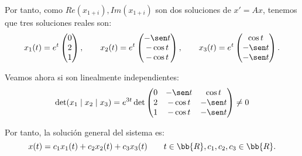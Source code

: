 \begin{ejercicio}
\begin{enumerate}
        Por tanto, como $Re(x_{1+i}), Im(x_{1+i})$ son dos soluciones de $x' = Ax$, tenemos que tres soluciones reales son:
        \begin{equation*}
            x_1(t) = e^t\begin{pmatrix}
                0\\
                2\\
                1
            \end{pmatrix},\qquad
            x_2(t) = e^t\begin{pmatrix}
                -\sen t\\
                -\cos t\\
                -\cos t
            \end{pmatrix},\qquad
            x_3(t) = e^t\begin{pmatrix}
                \cos t\\
                -\sen t\\
                -\sen t
            \end{pmatrix}.
        \end{equation*}

        Veamos ahora si son linealmente independientes:
        \begin{equation*}
            \det(x_1\mid x_2\mid x_3) = e^{3t}\det\begin{pmatrix}
                0 & -\sen t & \cos t\\
                2 & -\cos t & -\sen t\\
                1 & -\cos t & -\sen t
            \end{pmatrix}\neq 0
        \end{equation*}

        Por tanto, la solución general del sistema es:
        \begin{equation*}
            x(t) = c_1x_1(t) + c_2x_2(t) + c_3x_3(t)\qquad t\in \bb{R}, c_1, c_2, c_3\in \bb{R}.
        \end{equation*}
    \end{enumerate}
\end{ejercicio}

